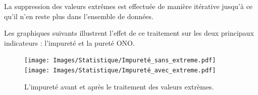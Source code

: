 \documentclass[12pt]{article}
\begin{document}
La suppression des valeurs extrêmes est effectuée de manière itérative 
jusqu'à ce qu'il n'en reste plus dans l'ensemble de données.


Les graphiques suivants illustrent l'effet de ce traitement sur les 
deux principaux indicateurs : l'impureté et la pureté ONO.

\begin{figure}[H]
    \centering
    \begin{adjustbox}{width=1.3\textwidth,center}
        \texttt{[image: Images/Statistique/Impureté\_sans\_extreme.pdf]}
        \texttt{[image: Images/Statistique/Impureté\_avec\_extreme.pdf]}
    \end{adjustbox}
    \caption{L'impureté avant et après le traitement des valeurs extrèmes.}
    \label{fig:ExtremeImpurete}
\end{figure}
\end{document}

